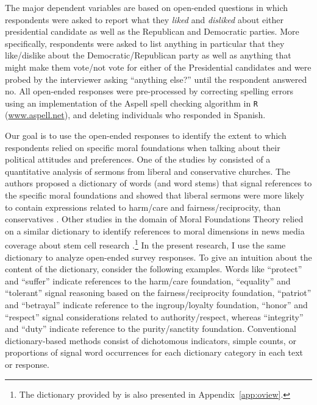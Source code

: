 \documentclass[12pt]{article}
\begin{document}
The major dependent variables are based on open-ended questions in which respondents were asked to report what they \textit{liked} and \textit{disliked} about either presidential candidate as well as the Republican and Democratic parties. More specifically, respondents were asked to list anything in particular that they like/dislike about the Democratic/Republican party as well as anything that might make them vote/not vote for either of the Presidential candidates and were probed by the interviewer asking ``anything else?'' until the respondent answered no. All open-ended responses were pre-processed by correcting spelling errors using an implementation of the Aspell spell checking algorithm in \texttt{R} (\url{www.aspell.net}), and deleting individuals who responded in Spanish. 

Our goal is to use the open-ended responses to identify the extent to which respondents relied on specific moral foundations when talking about their political attitudes and preferences. One of the studies by \citet{graham2009liberals} consisted of a quantitative analysis of sermons from liberal and conservative churches. The authors proposed a dictionary of words (and word stems) that signal references to the specific moral foundations and showed that liberal sermons were more likely to contain expressions related to harm/care and fairness/reciprocity, than conservatives \citep[see also][for multi-dimensional conceptualizations of ideology]{haidt2009above}. Other studies in the domain of Moral Foundations Theory relied on a similar dictionary to identify references to moral dimensions in news media coverage about stem cell research \citep{clifford2013words}.\footnote{The dictionary provided by \citet{graham2009liberals} is also presented in Appendix~\ref{app:oview}.} In the present research, I use the same dictionary to analyze open-ended survey responses. To give an intuition about the content of the dictionary, consider the following examples. Words like ``protect'' and ``suffer'' indicate references to the harm/care foundation, ``equality'' and ``tolerant'' signal reasoning based on the fairness/reciprocity foundation, ``patriot'' and ``betrayal'' indicate reference to the ingroup/loyalty foundation, ``honor'' and ``respect'' signal considerations related to authority/respect, whereas ``integrity'' and ``duty'' indicate reference to the purity/sanctity foundation. Conventional dictionary-based methods consist of dichotomous indicators, simple counts, or proportions of signal word occurrences for each dictionary category in each text or response.
\end{document}
